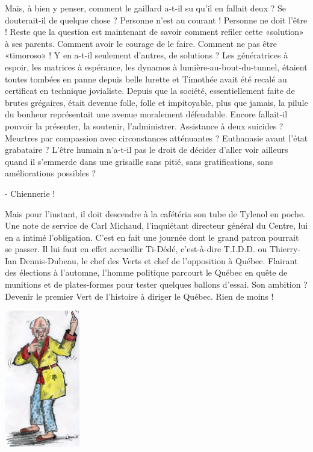 Mais, à bien y penser, comment le gaillard a-t-il su qu’il en fallait deux ? Se douterait-il de quelque chose ? Personne n’est au courant ! Personne ne doit l’être ! Reste que la question est maintenant de savoir comment refiler cette «solution» à ses parents. Comment avoir le courage de le faire. Comment ne pas être «timoroso» ! Y en a-t-il seulement d’autres, de solutions ? Les génératrices à espoir, les matrices à espérance, les dynamos à lumière-au-bout-du-tunnel, étaient toutes tombées en panne depuis belle lurette et Timothée avait été recalé au certificat en technique jovialiste. Depuis que la société, essentiellement faite de brutes grégaires, était devenue folle, folle et impitoyable, plus que jamais, la pilule du bonheur représentait une avenue moralement défendable. Encore fallait-il pouvoir la présenter, la soutenir, l’administrer. Assistance à deux suicides ? Meurtres par compassion avec circonstances atténuantes ? Euthanasie avant l’état grabataire ? L’être humain n’a-t-il pas le droit de décider d’aller voir ailleurs quand il s’emmerde dans une grisaille sans pitié, sans gratifications, sans améliorations possibles ?

- Chiennerie !

Mais pour l’instant, il doit descendre à la cafétéria son tube de Tylenol en poche. Une note de service de Carl Michaud, l’inquiétant directeur général du Centre, lui en a intimé l’obligation. C’est en fait une journée dont le grand patron pourrait se passer. Il lui faut en effet accueillir Ti-Dédé, c’est-à-dire T.I.D.D. ou Thierry-Ian Dennis-Dubeau, le chef des Verts et chef de l’opposition à Québec. Flairant des élections à l’automne, l’homme politique parcourt le Québec en quête de munitions et de plates-formes pour tester quelques ballons d’essai. Son ambition ? Devenir le premier Vert de l’histoire à diriger le Québec. Rien de moins ! 

\begin{floatingfigure}[l]{40mm}
\includegraphics[height=60mm]{corps/chapitre6/img/personnage-vader.jpg}
\end{floatingfigure}

